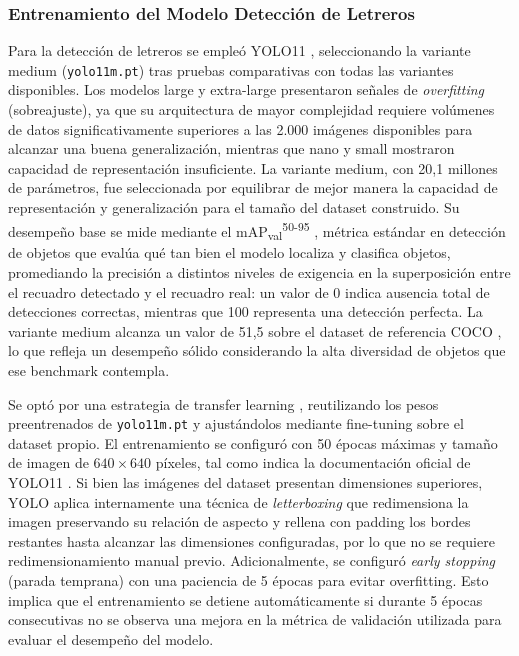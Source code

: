 \documentclass[runningheads]{llncs}
\begin{document}
\subsubsection{Entrenamiento del Modelo Detección de Letreros}
Para la detección de letreros se empleó YOLO11 \cite{yolo11_ultralytics}, 
seleccionando la variante medium (\texttt{yolo11m.pt}) tras pruebas 
comparativas con todas las variantes disponibles. Los modelos large y 
extra-large presentaron señales de \textit{overfitting} (sobreajuste), 
ya que su arquitectura de mayor complejidad requiere volúmenes de datos 
significativamente superiores a las 2.000 imágenes disponibles para 
alcanzar una buena generalización, mientras que nano y small mostraron 
capacidad de representación insuficiente. La variante medium, con 20,1 
millones de parámetros, fue seleccionada por equilibrar de mejor manera 
la capacidad de representación y generalización para el tamaño del 
dataset construido. Su desempeño base se mide mediante el 
mAP\textsubscript{val}\textsuperscript{50-95} \cite{yolo11_ultralytics}, 
métrica estándar en detección de objetos que evalúa qué tan bien el 
modelo localiza y clasifica objetos, promediando la precisión a distintos 
niveles de exigencia en la superposición entre el recuadro detectado y 
el recuadro real: un valor de 0 indica ausencia total de detecciones 
correctas, mientras que 100 representa una detección perfecta. La 
variante medium alcanza un valor de 51,5 sobre el dataset de referencia 
COCO \cite{coco-microsoft}, lo que refleja un desempeño sólido 
considerando la alta diversidad de objetos que ese benchmark contempla.

Se optó por una estrategia de transfer learning \cite{transfer-learning}, 
reutilizando los pesos preentrenados de \texttt{yolo11m.pt} y 
ajustándolos mediante fine-tuning \cite{fine-tuning} sobre el dataset 
propio. El entrenamiento se configuró con 50 épocas máximas y tamaño 
de imagen de $640 \times 640$ píxeles, tal como indica la documentación 
oficial de YOLO11 \cite{yolo11_ultralytics}. Si bien las imágenes del 
dataset presentan dimensiones superiores, YOLO aplica internamente una 
técnica de \textit{letterboxing} \cite{letterbox-yolo} que redimensiona 
la imagen preservando su relación de aspecto y rellena con padding los 
bordes restantes hasta alcanzar las dimensiones configuradas, por lo que 
no se requiere redimensionamiento manual previo. Adicionalmente, se 
configuró \textit{early stopping} (parada temprana) con una paciencia de 
5 épocas para evitar overfitting. Esto implica que el entrenamiento
 se detiene automáticamente si durante 5 épocas consecutivas no se observa
  una mejora en la métrica de validación utilizada para evaluar el desempeño del modelo.
\end{document}
